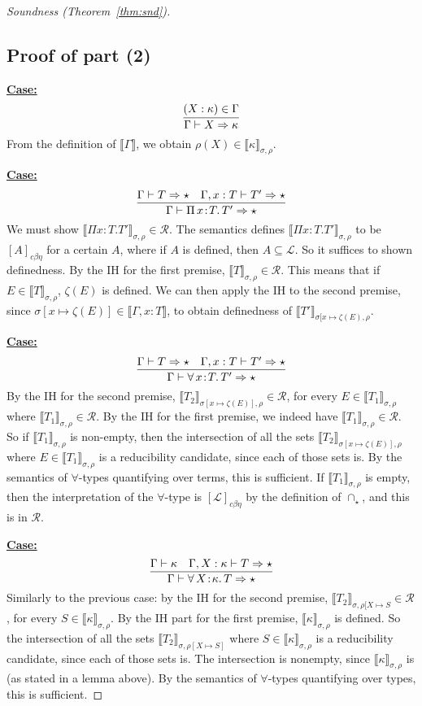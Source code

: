 \documentclass{article}
\newcommand{\choice}[0]{\zeta}
\newcommand{\elcap}[0]{\cap}
\newcommand{\abs}[4]{{#1}\, #2\! : \! #3.\, #4}
\newcommand{\interp}[1]{\llbracket #1 \rrbracket}
\newcommand{\tpsynth}[0]{\Rightarrow}
\newcommand{\cbe}[0]{c\beta\eta}
\newcommand{\startcase}[1]{\vspace{#1} \noindent\textbf{\underline{Case:}}}
\begin{document}
\begin{proof}[Soundness (Theorem~\ref{thm:snd})]
\subsection{Proof of part (2)}

\startcase{.2cm}
\[
\infer{\Gamma \vdash X \tpsynth \kappa}{(X : \kappa) \in \Gamma} 
\]
From the definition of $\interp{\Gamma}$, we obtain
$\rho(X)\in\interp{\kappa}_{\sigma,\rho}$.

\startcase{.2cm}
\[
   \infer{\Gamma\vdash\abs{\Pi}{x}{T}{T'} \tpsynth \star}{\Gamma \vdash T \tpsynth \star & \Gamma,x:T\vdash T' \tpsynth \star} 
\]
We must show $\interp{\Pi x:T.T'}_{\sigma,\rho}\in\mathcal{R}$. The
semantics defines $\interp{\Pi x:T.T'}_{\sigma,\rho}$ to be
$[A]_{\cbe}$ for a certain $A$, where if $A$ is defined, then
$A\subseteq\mathcal{L}$.  So it suffices to shown definedness. By the IH
for the first premise, $\interp{T}_{\sigma,\rho}\in\mathcal{R}$.  This
means that if $E\in\interp{T}_{\sigma,\rho}$, $\choice(E)$ is defined.
We can then apply the IH to the second premise, since
$\sigma[x\mapsto\choice(E)]\in\interp{\Gamma,x:T}$, to obtain
definedness of $\interp{T'}_{\sigma[x\mapsto\choice(E),\rho}$.


\startcase{.2cm}
\[
   \infer{\Gamma\vdash\abs{\forall}{x}{T}{T'} \tpsynth \star}{\Gamma \vdash T \tpsynth \star & \Gamma,x:T\vdash T' \tpsynth \star} 
\]
By the IH for the second premise, $\interp{T_2}_{\sigma[x\mapsto  \choice(E)],\rho}\in\mathcal{R}$, for every
$E\in\interp{T_1}_{\sigma,\rho}$ where
$\interp{T_1}_{\sigma,\rho}\in\mathcal{R}$.  By the IH for the first
premise, we indeed have $\interp{T_1}_{\sigma,\rho}\in\mathcal{R}$.
So if $\interp{T_1}_{\sigma,\rho}$ is non-empty, then the intersection of all the sets
$\interp{T_2}_{\sigma[x\mapsto \choice(E)],\rho}$ where $E\in\interp{T_1}_{\sigma,\rho}$ is a
reducibility candidate, since each of those sets is.  By the semantics
of $\forall$-types quantifying over terms, this is sufficient.  If $\interp{T_1}_{\sigma,\rho}$ is
empty, then the interpretation of the $\forall$-type is $[\mathcal{L}]_{\cbe}$ by the definition
of $\elcap_\star$, and this is in $\mathcal{R}$.

\startcase{.2cm}
\[
    \infer{\Gamma\vdash \abs{\forall}{X}{\kappa}{T} \tpsynth \star}{\Gamma \vdash \kappa & \Gamma,X:\kappa\vdash T \tpsynth \star} 
\]
Similarly to the previous case: by the IH for the second premise,
$\interp{T_2}_{\sigma,\rho[X\mapsto S}\in\mathcal{R}$, for every
$S\in\interp{\kappa}_{\sigma,\rho}$.  By the IH part for the first
premise, $\interp{\kappa}_{\sigma,\rho}$ is defined.  So the
intersection of all the sets $\interp{T_2}_{\sigma,\rho[X\mapsto S]}$
where $S\in\interp{\kappa}_{\sigma,\rho}$ is a reducibility candidate,
since each of those sets is.  The intersection is nonempty, since $\interp{\kappa}_{\sigma,\rho}$ is (as stated in a lemma above).
By the semantics of $\forall$-types
quantifying over types, this is sufficient. 


\end{proof}
\end{document}

